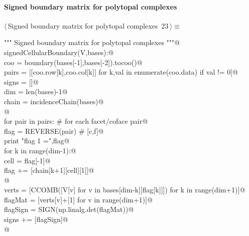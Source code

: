 \documentclass[11pt,oneside]{article}	%
\begin{document}
\paragraph{Signed boundary matrix for polytopal complexes}

\begin{flushleft} \small \label{scrap40}
\protect{}$\langle\,$Signed boundary matrix for polytopal complexes\nobreak\ {\footnotesize 23}$\,\rangle\equiv$
\vspace{-1ex}
\begin{list}{}{} \item
\mbox{}\verb@""" Signed boundary matrix for polytopal complexes """@\\
\mbox{}\verb@def signedCellularBoundary(V,bases):@\\
\mbox{}\verb@   coo = boundary(bases[-1],bases[-2]).tocoo()@\\
\mbox{}\verb@   pairs = [[coo.row[k],coo.col[k]] for k,val in enumerate(coo.data) if val != 0]@\\
\mbox{}\verb@   signs = []@\\
\mbox{}\verb@   dim = len(bases)-1@\\
\mbox{}\verb@   chain = incidenceChain(bases)@\\
\mbox{}\verb@   @\\
\mbox{}\verb@   for pair in pairs:      # for each facet/coface pair@\\
\mbox{}\verb@      flag = REVERSE(pair) #  [c,f]@\\
\mbox{}\verb@      print "flag 1 =",flag@\\
\mbox{}\verb@      for k in range(dim-1):@\\
\mbox{}\verb@         cell = flag[-1]@\\
\mbox{}\verb@         flag += [chain[k+1][cell][1]]@\\
\mbox{}\verb@      @\\
\mbox{}\verb@      verts = [CCOMB([V[v] for v in bases[dim-k][flag[k]]]) for k in range(dim+1)]@\\
\mbox{}\verb@      flagMat = [verts[v]+[1] for v in range(dim+1)]@\\
\mbox{}\verb@      flagSign = SIGN(np.linalg.det(flagMat))@\\
\mbox{}\verb@      signs += [flagSign]@\\
\mbox{}\verb@   @\\

\end{list}
\end{flushleft}
\end{document}
